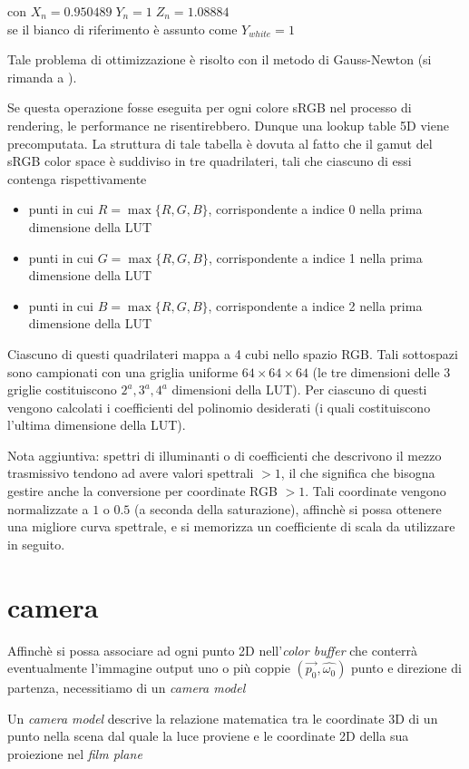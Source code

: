 \begin{center}
con $X_n = 0.950489\;Y_n = 1\; Z_n = 1.08884$\\
se il bianco di riferimento \`e assunto come $Y_{white} = 1$\par
\end{center}
Tale problema di ottimizzazione \`e risolto con il metodo di Gauss-Newton (si rimanda a \cite{pharr}).\par
Se questa operazione fosse eseguita per ogni colore sRGB nel processo di rendering, le performance ne risentirebbero. Dunque una lookup table 5D viene
precomputata. La struttura di tale tabella \`e dovuta al fatto che il gamut del sRGB color space \`e suddiviso in tre quadrilateri, tali che 
ciascuno di essi contenga rispettivamente 
\begin{itemize}[topsep=0pt, noitemsep]
	\item punti in cui $R = \max\{R, G, B\}$, corrispondente a indice 0 nella prima dimensione della LUT
	\item punti in cui $G = \max\{R, G, B\}$, corrispondente a indice 1 nella prima dimensione della LUT
	\item punti in cui $B = \max\{R, G, B\}$, corrispondente a indice 2 nella prima dimensione della LUT
\end{itemize}
Ciascuno di questi quadrilateri mappa a 4 cubi nello spazio RGB. Tali sottospazi sono campionati con una griglia uniforme 
$64\times 64\times64$ (le tre dimensioni 
delle 3 griglie costituiscono $2^a, 3^a, 4^a$ dimensioni della LUT). Per ciascuno di questi vengono calcolati i coefficienti del polinomio 
desiderati (i quali costituiscono l'ultima dimensione della LUT).\par
Nota aggiuntiva: spettri di illuminanti o di coefficienti che descrivono il mezzo trasmissivo tendono ad avere valori spettrali $>1$, il che significa
che bisogna gestire anche la conversione per coordinate RGB $>1$. Tali coordinate vengono normalizzate a $1$ o $0.5$ (a seconda della saturazione), 
affinch\`e si possa ottenere una migliore curva spettrale, e si memorizza un coefficiente di scala da utilizzare in seguito.
\section{camera}\label{chapter2:camera}
Affinch\`e si possa associare ad ogni punto 2D nell'\textit{color buffer} che conterr\`a eventualmente l'immagine output uno o pi\`u coppie 
$(\vec{p_0}, \hat{\omega_0})$ punto e direzione di partenza, necessitiamo di un \textit{camera model}
\begin{definitionS}
	Un \textit{camera model} descrive la relazione matematica tra le coordinate 3D di un punto nella scena dal quale la luce proviene e le coordinate 
	2D della sua proiezione nel \textit{film plane}\footnotemark{} \cite{vision}
\end{definitionS}
